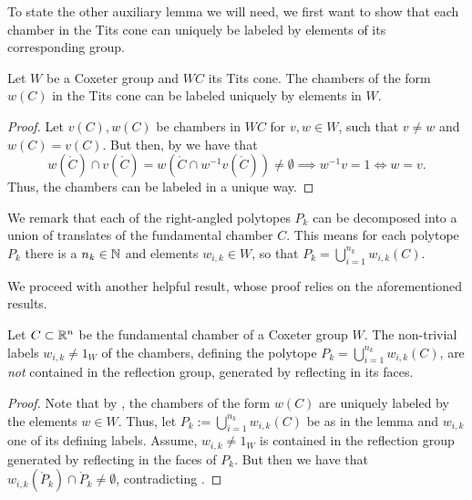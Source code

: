 To state the other auxiliary lemma we will need, we first want to show that each chamber in the Tits cone can uniquely be labeled by elements of its corresponding group.

\begin{lemma}\label{lem:labels}
    Let \(W\) be a Coxeter group and \(WC\) its Tits cone.
    The chambers of the form \(w(C)\) in the Tits cone can be labeled uniquely by elements in \(W\).
\end{lemma}
\begin{proof}
    Let \(v(C), w(C)\) be chambers in \(WC\) for \(v, w \in W\), such that \(v \neq w\) and \(w(C) = v(C)\).\newline
    But then, by  we have that
    \[w(\mathring{C}) \cap v(\mathring{C}) = w(\mathring{C} \cap w^{-1}v(\mathring{C})) \neq \emptyset \implies w^{-1}v = 1 \iff w = v.\]
    Thus, the chambers can be labeled in a unique way.
\end{proof}

\begin{remark}
    We remark that each of the right-angled polytopes \(P_k\) can be decomposed into a union of translates of the fundamental chamber \(C\).
    This means for each polytope \(P_k\) there is a \(n_k \in \mathbb{N}\) and elements \(w_{i,k} \in W\), so that \(P_k = \bigcup_{i=1}^{n_k} w_{i,k}(C)\).
\end{remark}

We proceed with another helpful result, whose proof relies on the aforementioned results.

\begin{lemma}
    Let \(C \subset \mathbb{R}^n\) be the fundamental chamber of a Coxeter group \(W\).
    The non-trivial labels \(w_{i,k} \neq 1_W\) of the chambers, defining the polytope \(P_k = \bigcup_{i=1}^{n_k} w_{i,k}(C)\), are \emph{not} contained in the reflection group, generated by reflecting in its faces.
\end{lemma}
\begin{proof}
    Note that by , the chambers of the form \(w(C)\) are uniquely labeled by the elements \(w \in W\).
    Thus, let \(P_k := \bigcup_{i = 1}^{n_k} w_{i,k}(C)\) be as in the lemma and \(w_{i,k}\) one of its defining labels.
    Assume, \(w_{i,k} \neq 1_W\) is contained in the reflection group generated by reflecting in the faces of \(P_k\).
    But then we have that \(w_{i,k}(\mathring{P}_k) \cap \mathring{P}_k \neq \emptyset\), contradicting .
\end{proof}

